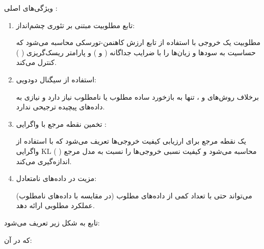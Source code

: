 \documentclass[11pt, a4paper, oneside]{book}
\begin{document}
				ویژگی‌های اصلی :
				
					\begin{enumerate}
						
						\item {\large تابع مطلوبیت مبتنی بر تئوری چشم‌انداز}:
						
						مطلوبیت یک خروجی با استفاده از تابع ارزش کاهنمن-تورسکی محاسبه می‌شود که حساسیت به سودها و زیان‌ها را با ضرایب جداگانه (
						و 
						) و پارامتر ریسک‌گریزی (
						\lr{$\beta$}
						) کنترل می‌کند.
						
						\item {\large استفاده از سیگنال دودویی}:
						
						برخلاف روش‌های  و ،  تنها به بازخورد ساده مطلوب یا نامطلوب نیاز دارد و نیازی به داده‌های پیچیده ترجیحی ندارد.
						
						\item {\large تخمین نقطه مرجع با واگرایی }:
						
						یک نقطه مرجع 
						برای ارزیابی کیفیت خروجی‌ها تعریف می‌شود که با استفاده از واگرایی KL محاسبه می‌شود و کیفیت نسبی خروجی‌ها را نسبت به مدل مرجع (
						) اندازه‌گیری می‌کند.
						
						\item {\large مزیت در داده‌های نامتعادل}:
						
						می‌تواند حتی با تعداد کمی از داده‌های مطلوب (در مقایسه با داده‌های نامطلوب) عملکرد مطلوبی ارائه دهد.
						
					\end{enumerate}
					
					تابع   به شکل زیر تعریف می‌شود:
					
					\begin{center}
					\end{center}
					
					که در آن:
					
\end{document}
